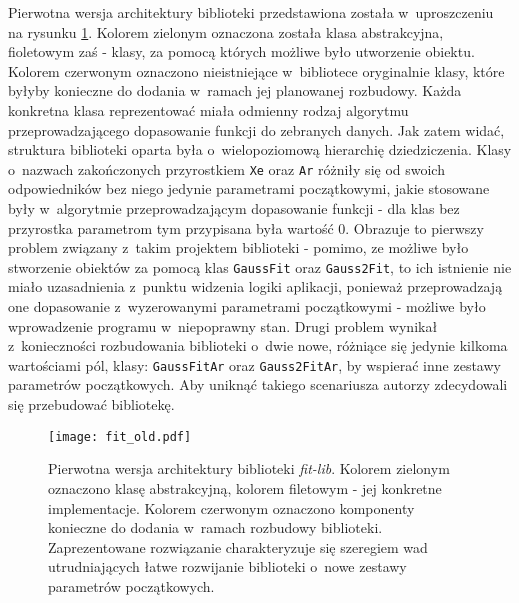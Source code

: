 Pierwotna wersja architektury biblioteki przedstawiona została w~uproszczeniu na rysunku \ref{fig:fit_old}. Kolorem zielonym oznaczona została klasa abstrakcyjna, fioletowym zaś - klasy, za pomocą których możliwe było utworzenie obiektu. Kolorem czerwonym oznaczono nieistniejące w~bibliotece oryginalnie klasy, które byłyby konieczne do dodania w~ramach jej planowanej rozbudowy. Każda konkretna klasa reprezentować miała odmienny rodzaj algorytmu przeprowadzającego dopasowanie funkcji do zebranych danych. Jak zatem widać, struktura biblioteki oparta była o~wielopoziomową hierarchię dziedziczenia. Klasy o~nazwach zakończonych przyrostkiem \lstinline{Xe} oraz \lstinline{Ar} różniły się od swoich odpowiedników bez niego jedynie parametrami początkowymi, jakie stosowane były w~algorytmie przeprowadzającym dopasowanie funkcji - dla klas bez przyrostka parametrom tym przypisana była wartość 0. Obrazuje to pierwszy problem związany z~takim projektem biblioteki - pomimo, ze możliwe było stworzenie obiektów za pomocą klas \lstinline{GaussFit} oraz \lstinline{Gauss2Fit}, to ich istnienie nie miało uzasadnienia z~punktu widzenia logiki aplikacji, ponieważ przeprowadzają one dopasowanie z~wyzerowanymi parametrami początkowymi - możliwe było wprowadzenie programu w~niepoprawny stan. Drugi problem wynikał z~konieczności rozbudowania biblioteki o~dwie nowe, różniące się jedynie kilkoma wartościami pól, klasy: \lstinline{GaussFitAr} oraz \lstinline{Gauss2FitAr}, by wspierać inne zestawy parametrów początkowych. Aby uniknąć takiego scenariusza autorzy zdecydowali się przebudować bibliotekę.


\begin{figure}[H]
\centering
\texttt{[image: fit\_old.pdf]}
\caption{Pierwotna wersja architektury biblioteki \emph{fit-lib}. Kolorem zielonym oznaczono klasę abstrakcyjną, kolorem filetowym - jej konkretne implementacje. Kolorem czerwonym oznaczono komponenty konieczne do dodania w~ramach rozbudowy biblioteki. Zaprezentowane rozwiązanie charakteryzuje się szeregiem wad utrudniających łatwe rozwijanie biblioteki o~nowe zestawy parametrów początkowych.}
\label{fig:fit_old}
\end{figure}

